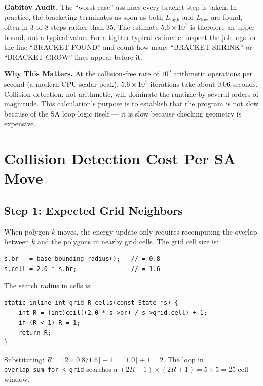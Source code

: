 \documentclass[11pt,oneside]{article}
\newcommand{\gabitov}[1]{\begin{gabitovbox}\textbf{Gabitov Audit.} #1\end{gabitovbox}}
\newcommand{\akoglu}[1]{\begin{akoglubox}\textbf{Why This Matters.} #1\end{akoglubox}}
\begin{document}
\gabitov{%
The ``worst case'' assumes every bracket step is taken. In practice,
the bracketing terminates as soon as both $L_{\mathrm{high}}$ and
$L_{\mathrm{low}}$ are found, often in 3 to 8 steps rather than 35.
The estimate $5.6 \times 10^7$ is therefore an upper bound, not a
typical value. For a tighter typical estimate, inspect the job logs for
the line ``BRACKET FOUND'' and count how many ``BRACKET SHRINK'' or
``BRACKET GROW'' lines appear before it.%
}

\akoglu{%
At the collision-free rate of $10^9$ arithmetic operations per second
(a modern CPU scalar peak), $5.6 \times 10^7$ iterations take about
0.06 seconds. Collision detection, not arithmetic, will dominate the
runtime by several orders of magnitude. This calculation's purpose is
to establish that the program is not slow because of the SA loop logic
itself --- it is slow because checking geometry is expensive.%
}

\section{Collision Detection Cost Per SA Move}
\label{sec:collision}

\subsection{Step 1: Expected Grid Neighbors}

When polygon $k$ moves, the energy update only requires recomputing
the overlap between $k$ and the polygons in nearby grid cells. The
grid cell size is:

\begin{lstlisting}[style=cstyle,caption={Grid cell size from \texttt{state\_alloc()}.}]
s.br   = base_bounding_radius();   // = 0.8
s.cell = 2.0 * s.br;               // = 1.6
\end{lstlisting}

The search radius in cells is:

\begin{lstlisting}[style=cstyle,caption={\texttt{grid\_R\_cells()} in \texttt{HPC\_parallel.c}.}]
static inline int grid_R_cells(const State *s) {
    int R = (int)ceil((2.0 * s->br) / s->grid.cell) + 1;
    if (R < 1) R = 1;
    return R;
}
\end{lstlisting}

Substituting: $R = \lceil 2 \times 0.8 / 1.6 \rceil + 1 = \lceil
1.0 \rceil + 1 = 2$. The loop in \texttt{overlap\_sum\_for\_k\_grid}
searches a $(2R+1) \times (2R+1) = 5 \times 5 = 25$-cell window.
\end{document}
